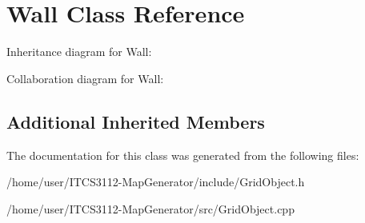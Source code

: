 \hypertarget{classWall}{}\section{Wall Class Reference}
\label{classWall}


Inheritance diagram for Wall\+:


Collaboration diagram for Wall\+:
\subsection*{Additional Inherited Members}


The documentation for this class was generated from the following files\+:\begin{DoxyCompactItemize}
\item 
/home/user/\+I\+T\+C\+S3112-\/\+Map\+Generator/include/Grid\+Object.\+h\item 
/home/user/\+I\+T\+C\+S3112-\/\+Map\+Generator/src/Grid\+Object.\+cpp\end{DoxyCompactItemize}
